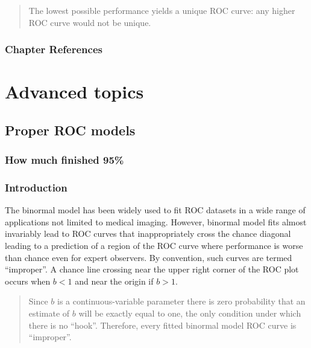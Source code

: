 \documentclass[
]{book}
\begin{document}
\begin{quote}
The lowest possible performance yields a unique ROC curve: any higher ROC curve would not be unique.
\end{quote}

\hypertarget{binormal-model-references}{%
\section{Chapter References}\label{binormal-model-references}}

\hypertarget{part-advanced-topics}{%
\part*{Advanced topics}\label{part-advanced-topics}}

\hypertarget{proper-roc-models}{%
\chapter{Proper ROC models}\label{proper-roc-models}}

\hypertarget{proper-roc-models-how-much-finished}{%
\section{How much finished 95\%}\label{proper-roc-models-how-much-finished}}

\hypertarget{proper-roc-models-introduction}{%
\section{Introduction}\label{proper-roc-models-introduction}}

The binormal model has been widely used to fit ROC datasets in a wide range of applications not limited to medical imaging. However, binormal model fits almost invariably lead to ROC curves that inappropriately cross the chance diagonal leading to a prediction of a region of the ROC curve where performance is worse than chance even for expert observers. By convention, such curves are termed ``improper''. A chance line crossing near the upper right corner of the ROC plot occurs when \(b < 1\) and near the origin if \(b > 1\).

\begin{quote}
Since \(b\) is a continuous-variable parameter there is zero probability that an estimate of \(b\) will be exactly equal to one, the only condition under which there is no ``hook''. Therefore, every fitted binormal model ROC curve is ``improper''.
\end{quote}
\end{document}
